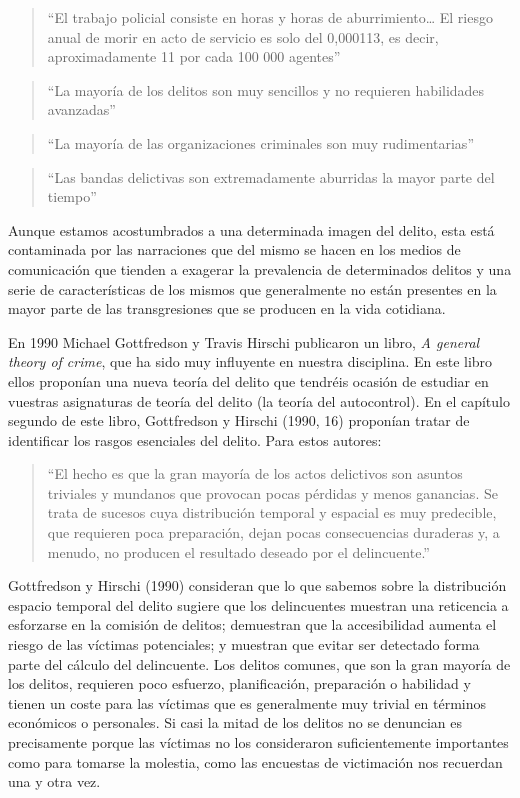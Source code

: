 \documentclass[
  spanish,
  letterpaper,
  DIV=11,
  numbers=noendperiod]{scrreprt}
\begin{document}
\begin{quote}
``El trabajo policial consiste en horas y horas de aburrimiento\ldots{}
El riesgo anual de morir en acto de servicio es solo del 0,000113, es
decir, aproximadamente 11 por cada 100 000 agentes''
\end{quote}

\begin{quote}
``La mayoría de los delitos son muy sencillos y no requieren habilidades
avanzadas''
\end{quote}

\begin{quote}
``La mayoría de las organizaciones criminales son muy rudimentarias''
\end{quote}

\begin{quote}
``Las bandas delictivas son extremadamente aburridas la mayor parte del
tiempo''
\end{quote}

Aunque estamos acostumbrados a una determinada imagen del delito, esta
está contaminada por las narraciones que del mismo se hacen en los
medios de comunicación que tienden a exagerar la prevalencia de
determinados delitos y una serie de características de los mismos que
generalmente no están presentes en la mayor parte de las transgresiones
que se producen en la vida cotidiana.

En 1990 Michael Gottfredson y Travis Hirschi publicaron un libro,
\emph{A general theory of crime}, que ha sido muy influyente en nuestra
disciplina. En este libro ellos proponían una nueva teoría del delito
que tendréis ocasión de estudiar en vuestras asignaturas de teoría del
delito (la teoría del autocontrol). En el capítulo segundo de este
libro, Gottfredson y Hirschi (1990, 16) proponían tratar de identificar
los rasgos esenciales del delito. Para estos autores:

\begin{quote}
``El hecho es que la gran mayoría de los actos delictivos son asuntos
triviales y mundanos que provocan pocas pérdidas y menos ganancias. Se
trata de sucesos cuya distribución temporal y espacial es muy
predecible, que requieren poca preparación, dejan pocas consecuencias
duraderas y, a menudo, no producen el resultado deseado por el
delincuente.''
\end{quote}

Gottfredson y Hirschi (1990) consideran que lo que sabemos sobre la
distribución espacio temporal del delito sugiere que los delincuentes
muestran una reticencia a esforzarse en la comisión de delitos;
demuestran que la accesibilidad aumenta el riesgo de las víctimas
potenciales; y muestran que evitar ser detectado forma parte del cálculo
del delincuente. Los delitos comunes, que son la gran mayoría de los
delitos, requieren poco esfuerzo, planificación, preparación o habilidad
y tienen un coste para las víctimas que es generalmente muy trivial en
términos económicos o personales. Si casi la mitad de los delitos no se
denuncian es precisamente porque las víctimas no los consideraron
suficientemente importantes como para tomarse la molestia, como las
encuestas de victimación nos recuerdan una y otra vez.
\end{document}

